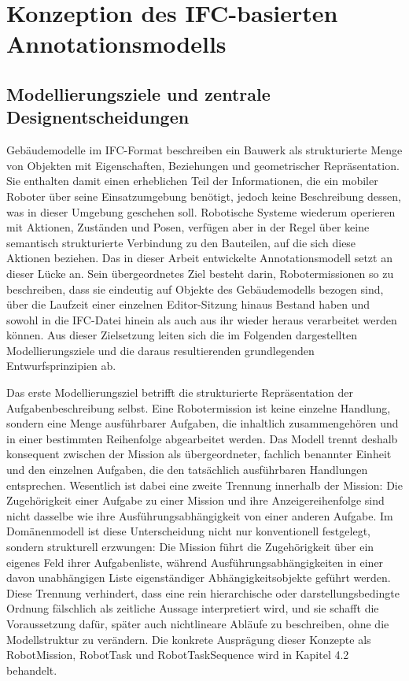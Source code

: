 \section{Konzeption des IFC-basierten Annotationsmodells}\label{sec:ifc-annotationsmodell}
\subsection{Modellierungsziele und zentrale Designentscheidungen}\label{subsec:modellierungsziele-annotationsmodell}
Gebäudemodelle im IFC-Format beschreiben ein Bauwerk als strukturierte Menge von Objekten mit
Eigenschaften, Beziehungen und geometrischer Repräsentation. Sie enthalten damit einen erheblichen
Teil der Informationen, die ein mobiler Roboter über seine Einsatzumgebung benötigt, jedoch keine
Beschreibung dessen, was in dieser Umgebung geschehen soll. Robotische Systeme wiederum operieren
mit Aktionen, Zuständen und Posen, verfügen aber in der Regel über keine semantisch strukturierte
Verbindung zu den Bauteilen, auf die sich diese Aktionen beziehen. Das in dieser Arbeit entwickelte
Annotationsmodell setzt an dieser Lücke an. Sein übergeordnetes Ziel besteht darin, Robotermissionen
so zu beschreiben, dass sie eindeutig auf Objekte des Gebäudemodells bezogen sind, über die Laufzeit
einer einzelnen Editor-Sitzung hinaus Bestand haben und sowohl in die IFC-Datei hinein als auch aus
ihr wieder heraus verarbeitet werden können. Aus dieser Zielsetzung leiten sich die im Folgenden
dargestellten Modellierungsziele und die daraus resultierenden grundlegenden Entwurfsprinzipien ab.

Das erste Modellierungsziel betrifft die strukturierte Repräsentation der Aufgabenbeschreibung
selbst. Eine Robotermission ist keine einzelne Handlung, sondern eine Menge ausführbarer Aufgaben,
die inhaltlich zusammengehören und in einer bestimmten Reihenfolge abgearbeitet werden. Das Modell
trennt deshalb konsequent zwischen der Mission als übergeordneter, fachlich benannter Einheit und
den einzelnen Aufgaben, die den tatsächlich ausführbaren Handlungen entsprechen. Wesentlich ist
dabei eine zweite Trennung innerhalb der Mission: Die Zugehörigkeit einer Aufgabe zu einer Mission
und ihre Anzeigereihenfolge sind nicht dasselbe wie ihre Ausführungsabhängigkeit von einer anderen
Aufgabe. Im Domänenmodell ist diese Unterscheidung nicht nur konventionell festgelegt, sondern
strukturell erzwungen: Die Mission führt die Zugehörigkeit über ein eigenes Feld ihrer
Aufgabenliste, während Ausführungsabhängigkeiten in einer davon unabhängigen Liste eigenständiger
Abhängigkeitsobjekte geführt werden. Diese Trennung verhindert, dass eine rein hierarchische oder
darstellungsbedingte Ordnung fälschlich als zeitliche Aussage interpretiert wird, und sie schafft
die Voraussetzung dafür, später auch nichtlineare Abläufe zu beschreiben, ohne die Modellstruktur zu
verändern. Die konkrete Ausprägung dieser Konzepte als RobotMission, RobotTask und RobotTaskSequence
wird in Kapitel 4.2 behandelt.

